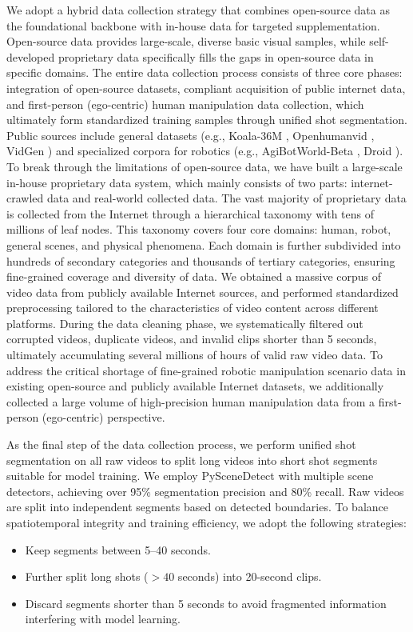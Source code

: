We adopt a hybrid data collection strategy that combines open-source data as the foundational backbone with in-house data for targeted supplementation. Open-source data provides large-scale, diverse basic visual samples, while self-developed proprietary data specifically fills the gaps in open-source data in specific domains. The entire data collection process consists of three core phases: integration of open-source datasets, compliant acquisition of public internet data, and first-person (ego-centric) human manipulation data collection, which ultimately form standardized training samples through unified shot segmentation.
Public sources include general datasets (e.g., Koala-36M \cite{wang2025koala36m}, Openhumanvid \cite{li2025openhumanvid}, VidGen \cite{tan2024vidgen1m}) and specialized corpora for robotics (e.g., AgiBotWorld-Beta \cite{AgiBotWorldContributors2025AgiBotWC}, Droid \cite{khazatsky2024droid}).
To break through the limitations of open-source data, we have built a large-scale in-house proprietary data system, which mainly consists of two parts: internet-crawled data and real-world collected data.
The vast majority of proprietary data is collected from the Internet through a hierarchical taxonomy with tens of millions of leaf nodes. This taxonomy covers four core domains: human, robot,  general scenes, and physical phenomena. Each domain is further subdivided into hundreds of secondary categories and thousands of tertiary categories, ensuring fine-grained coverage and diversity of data. 
We obtained a massive corpus of video data from publicly available Internet sources, and performed standardized preprocessing tailored to the characteristics of video content across different platforms. During the data cleaning phase, we systematically filtered out corrupted videos, duplicate videos, and invalid clips shorter than 5 seconds, ultimately accumulating several millions of hours of valid raw video data.
To address the critical shortage of fine-grained robotic manipulation scenario data in existing open-source and publicly available Internet datasets, we additionally collected a large volume of high-precision human manipulation data from a first-person (ego-centric) perspective.


As the final step of the data collection process, we perform unified shot segmentation on all raw videos to split long videos into short shot segments suitable for model training. We employ PySceneDetect with multiple scene detectors, achieving over 95\% segmentation precision and 80\% recall. Raw videos are split into independent segments based on detected boundaries. To balance spatiotemporal integrity and training efficiency, we adopt the following strategies:
\begin{itemize}
\item Keep segments between 5--40 seconds.
\item Further split long shots ($>40$ seconds) into 20-second clips.
\item Discard segments shorter than 5 seconds to avoid fragmented information interfering with model learning.
\end{itemize}

